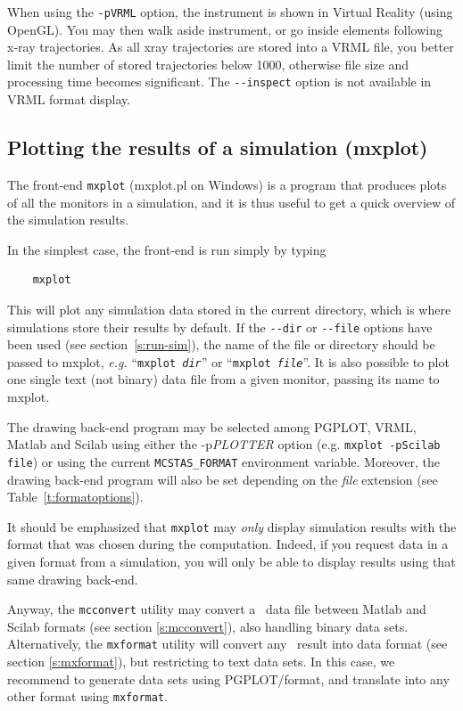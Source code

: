 When using the \verb+-pVRML+ option, the instrument is shown in Virtual Reality (using OpenGL). You may then walk aside instrument, or go inside elements following x-ray trajectories. As all xray trajectories are stored into a VRML file, you better limit the number of stored trajectories below 1000, otherwise file size and processing time becomes significant. The \verb+--inspect+ option is not available in VRML format display.

\subsection{Plotting the results of a simulation (mxplot)}
\label{s:mxplot}

The front-end \verb+mxplot+ (mxplot.pl on Windows) is a program that produces
plots of all the monitors in a simulation, and it is thus useful to get
a quick overview of the simulation results.

In the simplest case, the front-end is run simply by typing
\begin{verbatim}
    mxplot
\end{verbatim}
This will plot any simulation data stored in the current directory,
which is where simulations store their results by default. If the
\verb+--dir+ or \verb+--file+ options have been used (see
section~\ref{s:run-sim}), the name of the file or directory should be
passed to mxplot, {\em e.g.} ``\texttt{mxplot \textit{dir}}'' or ``\texttt{mxplot
  \textit{file}}''.
It is also possible to plot one single text (not binary) data file from a given monitor, passing its name to mxplot.

The drawing back-end program may be selected among PGPLOT, VRML, Matlab and Scilab using either the -p\textit{PLOTTER} option (e.g. \verb+mxplot -pScilab file+) or using the current \verb+MCSTAS_FORMAT+ environment variable.  Moreover, the drawing back-end program will also be set depending on the \textit{file} extension (see Table~\ref{t:formatoptions}).

It should be emphasized that \verb+mxplot+ may \emph{only} display simulation results with the format that was chosen during the computation. Indeed, if you request data in a given format from a simulation, you will only be able to display results using that same drawing back-end.

Anyway, the \verb+mcconvert+ utility may convert a \MCX\ data file between Matlab and Scilab formats (see section \ref{s:mcconvert}), also handling binary data sets. Alternatively, the \verb+mxformat+ utility will convert any \MCX\ result into data format (see section \ref{s:mxformat}), but restricting to text data sets. In this case, we recommend to generate data sets using PGPLOT/\MCX  format, and translate into any other format using \verb+mxformat+.

